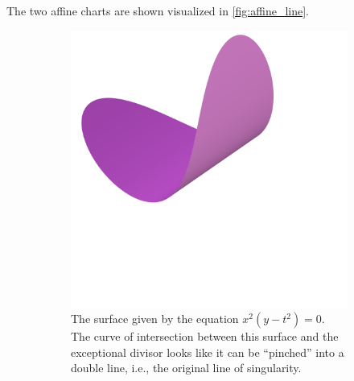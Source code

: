 \documentclass{article}
\begin{document}
\begin{example}
        The two affine charts are shown visualized in \cref{fig:affine_line}.

        \begin{figure}[h!]
            \centering
            \begin{subfigure}[t]{0.3\textwidth}
                \includegraphics[width=\textwidth]{pictures/line_blowup_affine_1.png}
                \caption{The surface given by the equation $x^2(y - t^2) = 0$. The
                    curve of intersection between this surface and the exceptional
                    divisor looks like it can be ``pinched'' into a double line, i.e., the
                original line of singularity.}
            \end{subfigure}
            ~
            \begin{subfigure}[t]{0.3\textwidth}

\end{subfigure}
\end{figure}
\end{example}
\end{document}
